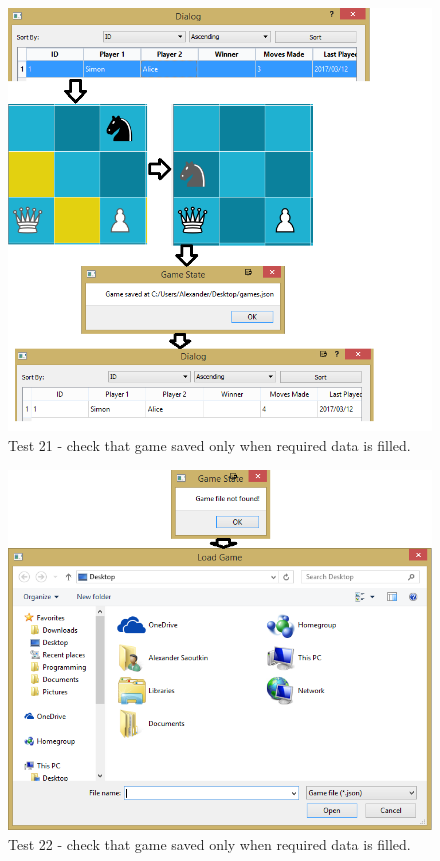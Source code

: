 \begin{figure}[H]
	\centering
	\includegraphics[width=1.0\textwidth]{images/screenshots/test-21}
	\caption{Test 21 - check that game saved only when required data is filled.}
	\label{test-21}
\end{figure}
\begin{figure}[H]
	\centering
	\includegraphics[width=1.0\textwidth]{images/screenshots/test-22}
	\caption{Test 22 - check that game saved only when required data is filled.}
	\label{test-22}
\end{figure}
